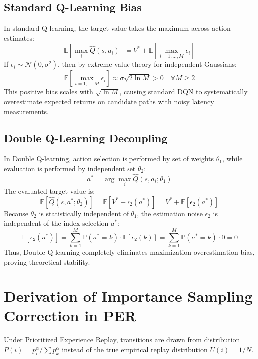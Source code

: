 \documentclass[12pt,a4paper,oneside]{report}
\begin{document}
\subsection{Standard Q-Learning Bias}
In standard Q-learning, the target value takes the maximum across action estimates:
\begin{equation}
    \mathbb{E}\left[ \max_i \hat{Q}(s, a_i) \right] = V^* + \mathbb{E}\left[ \max_{i=1,\dots,M} \epsilon_i \right]
\end{equation}
If $\epsilon_i \sim \mathcal{N}(0, \sigma^2)$, then by extreme value theory for independent Gaussians:
\begin{equation}
    \mathbb{E}\left[ \max_{i=1,\dots,M} \epsilon_i \right] \approx \sigma \sqrt{2 \ln M} > 0 \quad \forall M \ge 2
\end{equation}
This positive bias scales with $\sqrt{\ln M}$, causing standard DQN to systematically overestimate expected returns on candidate paths with noisy latency measurements.

\subsection{Double Q-Learning Decoupling}
In Double Q-learning, action selection is performed by set of weights $\theta_1$, while evaluation is performed by independent set $\theta_2$:
\begin{equation}
    a^* = \arg\max_i \hat{Q}(s, a_i; \theta_1)
\end{equation}
The evaluated target value is:
\begin{equation}
    \mathbb{E}\left[ \hat{Q}(s, a^*; \theta_2) \right] = \mathbb{E}\left[ V^* + \epsilon_2(a^*) \right] = V^* + \mathbb{E}[\epsilon_2(a^*)]
\end{equation}
Because $\theta_2$ is statistically independent of $\theta_1$, the estimation noise $\epsilon_2$ is independent of the index selection $a^*$:
\begin{equation}
    \mathbb{E}[\epsilon_2(a^*)] = \sum_{k=1}^M \mathbb{P}(a^* = k) \cdot \mathbb{E}[\epsilon_2(k)] = \sum_{k=1}^M \mathbb{P}(a^* = k) \cdot 0 = 0
\end{equation}
Thus, Double Q-learning completely eliminates maximization overestimation bias, proving theoretical stability.

\section{Derivation of Importance Sampling Correction in PER}
Under Prioritized Experience Replay, transitions are drawn from distribution $P(i) = p_i^\alpha / \sum p_k^\alpha$ instead of the true empirical replay distribution $U(i) = 1/N$.
\end{document}
